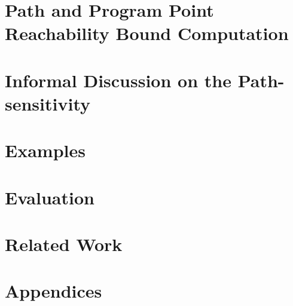 \documentclass[a4paper,11pt]{article}
\begin{document}
\section{Path and Program Point Reachability Bound Computation}
\label{sec:alg-rb}



\section{Informal Discussion on the Path-sensitivity}
\label{sec:thminformal}

\section{Examples}
\label{sec:example}

\section{Evaluation}
\section{Related Work}
%
\clearpage
\appendix
{}
\section*{Appendices}


\clearpage


\end{document}
